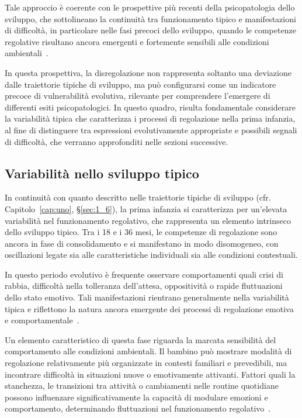         Tale approccio è coerente con le prospettive più recenti della psicopatologia dello sviluppo, che sottolineano la continuità tra funzionamento tipico e manifestazioni di difficoltà, in particolare nelle fasi precoci dello sviluppo, quando le competenze regolative risultano ancora emergenti e fortemente sensibili alle condizioni ambientali~\cite{cicchetti2009}.

        In questa prospettiva, la disregolazione non rappresenta soltanto una deviazione dalle traiettorie tipiche di sviluppo, ma può configurarsi come un indicatore precoce di vulnerabilità evolutiva, rilevante per comprendere l'emergere di differenti esiti psicopatologici. In questo quadro, risulta fondamentale considerare la variabilità tipica che caratterizza i processi di regolazione nella prima infanzia, al fine di distinguere tra espressioni evolutivamente appropriate e possibili segnali di difficoltà, che verranno approfonditi nelle sezioni successive.

        \subsection{Variabilità nello sviluppo tipico}
        \label{sec:2_1_1}

            In continuità con quanto descritto nelle traiettorie tipiche di sviluppo (cfr. Capitolo~\ref{cap:uno}, §\ref{sec:1_6}), la prima infanzia si caratterizza per un'elevata variabilità nel funzionamento regolativo, che rappresenta un elemento intrinseco dello sviluppo tipico. Tra i 18 e i 36 mesi, le competenze di regolazione sono ancora in fase di consolidamento e si manifestano in modo disomogeneo, con oscillazioni legate sia alle caratteristiche individuali sia alle condizioni contestuali.

            In questo periodo evolutivo è frequente osservare comportamenti quali crisi di rabbia, difficoltà nella tolleranza dell'attesa, oppositività o rapide fluttuazioni dello stato emotivo. Tali manifestazioni rientrano generalmente nella variabilità tipica e riflettono la natura ancora emergente dei processi di regolazione emotiva e comportamentale~\cite{eisenberg2010,kochanska2001}.

            Un elemento caratteristico di questa fase riguarda la marcata sensibilità del comportamento alle condizioni ambientali. Il bambino può mostrare modalità di regolazione relativamente più organizzate in contesti familiari e prevedibili, ma incontrare difficoltà in situazioni nuove o emotivamente attivanti. Fattori quali la stanchezza, le transizioni tra attività o cambiamenti nelle routine quotidiane possono influenzare significativamente la capacità di modulare emozioni e comportamento, determinando fluttuazioni nel funzionamento regolativo~\cite{tronick2007,kochanska2001}.

